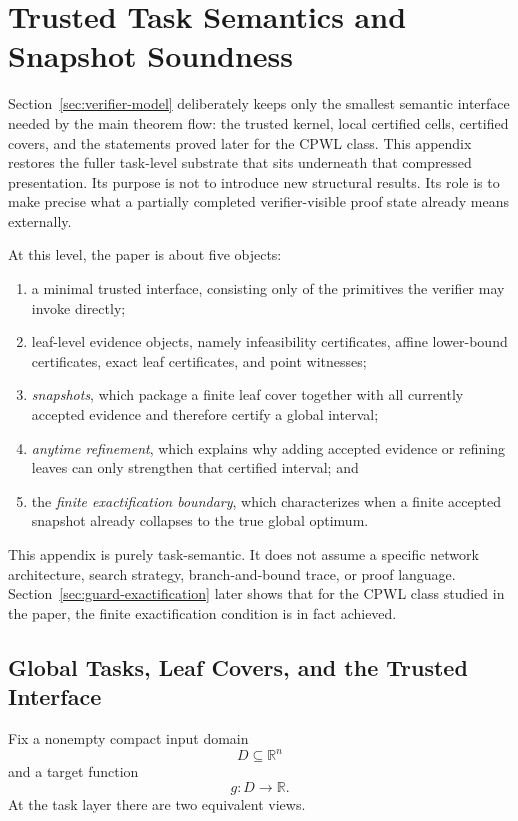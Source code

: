\section{Trusted Task Semantics and Snapshot Soundness}
\label{app:trusted-substrate}

Section~\ref{sec:verifier-model} deliberately keeps only the smallest semantic interface needed by the main theorem flow: the trusted kernel, local certified cells, certified covers, and the statements proved later for the CPWL class. This appendix restores the fuller task-level substrate that sits underneath that compressed presentation. Its purpose is not to introduce new structural results. Its role is to make precise what a partially completed verifier-visible proof state already means externally.

At this level, the paper is about five objects:
\begin{enumerate}
    \item a minimal trusted interface, consisting only of the primitives the verifier may invoke directly;
    \item leaf-level evidence objects, namely infeasibility certificates, affine lower-bound certificates, exact leaf certificates, and point witnesses;
    \item \emph{snapshots}, which package a finite leaf cover together with all currently accepted evidence and therefore certify a global interval;
    \item \emph{anytime refinement}, which explains why adding accepted evidence or refining leaves can only strengthen that certified interval; and
    \item the \emph{finite exactification boundary}, which characterizes when a finite accepted snapshot already collapses to the true global optimum.
\end{enumerate}

This appendix is purely task-semantic. It does not assume a specific network architecture, search strategy, branch-and-bound trace, or proof language. Section~\ref{sec:guard-exactification} later shows that for the CPWL class studied in the paper, the finite exactification condition is in fact achieved.

\subsection{Global Tasks, Leaf Covers, and the Trusted Interface}

Fix a nonempty compact input domain
\[
D\subseteq \mathbb R^n
\]
and a target function
\[
g:D\to \mathbb R.
\]
At the task layer there are two equivalent views.


